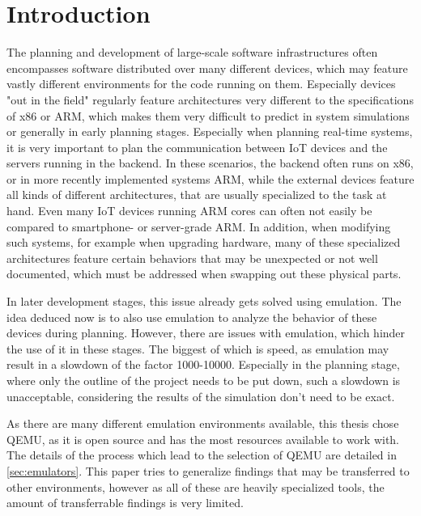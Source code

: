 
\chapter{Introduction}
The planning and development of large-scale software infrastructures often encompasses software distributed over many different devices,
which may feature vastly different environments for the code running on them.
Especially devices "out in the field" regularly feature architectures very different to the specifications of x86 or ARM,
which makes them very difficult to predict in system simulations or generally in early planning stages.
Especially when planning real-time systems,
it is very important to plan the communication between IoT devices and the servers running in the backend.
In these scenarios, the backend often runs on x86, or in more recently implemented systems ARM,
while the external devices feature all kinds of different architectures,
that are usually specialized to the task at hand.
Even many IoT devices running ARM cores can often not easily be compared to smartphone-
or server-grade ARM.
In addition, when modifying such systems, for example when upgrading hardware,
many of these specialized architectures feature certain behaviors that may be unexpected or not well documented,
which must be addressed when swapping out these physical parts.

In later development stages, this issue already gets solved using emulation.
The idea deduced now is to also use emulation to analyze the behavior of these devices during planning.
However, there are issues with emulation, which hinder the use of it in these stages.
The biggest of which is speed, as emulation may result in a slowdown of the factor 1000-10000\cite{slowdown}.
Especially in the planning stage, where only the outline of the project needs to be put down,
such a slowdown is unacceptable, considering the results of the simulation don't need to be exact.

As there are many different emulation environments available,
this thesis chose QEMU, as it is open source and has the most resources available to work with.
The details of the process which lead to the selection of QEMU are detailed in \autoref{sec:emulators}.
This paper tries to generalize findings that may be transferred to other environments,
however as all of these are heavily specialized tools,
the amount of transferrable findings is very limited.

